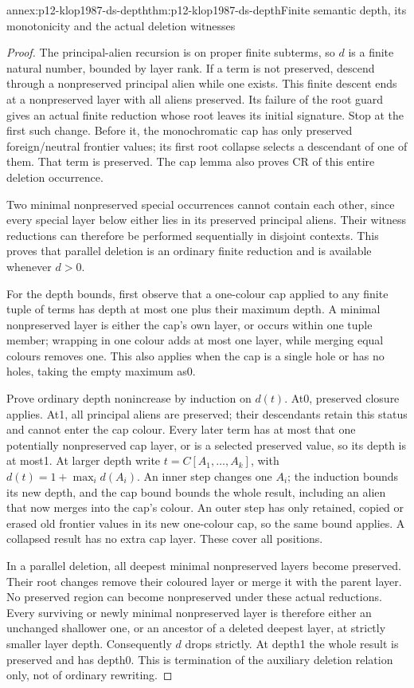 \begin{annexitem}{annex:p12-klop1987-ds-depth}{thm:p12-klop1987-ds-depth}{Finite semantic depth, its monotonicity and the actual deletion witnesses}
\begin{proof}
The principal-alien recursion is on proper finite subterms, so
\(d\) is a finite natural number, bounded by layer rank.
If a term is not preserved, descend through a nonpreserved principal
alien while one exists. This finite descent ends at a nonpreserved
layer with all aliens preserved. Its failure of the root guard gives
an actual finite reduction whose root leaves its initial signature.
Stop at the first such change. Before it, the monochromatic cap
has only preserved foreign/neutral frontier values; its first root
collapse selects a descendant of one of them. That term is preserved.
The cap lemma also proves CR of this entire deletion occurrence.

Two minimal nonpreserved special occurrences cannot contain each
other, since every special layer below either lies in its preserved
principal aliens. Their witness reductions can therefore be performed
sequentially in disjoint contexts. This proves that parallel deletion
is an ordinary finite reduction and is available whenever \(d>0\).

For the depth bounds, first observe that a one-colour cap applied
to any finite tuple of terms has depth at most one plus their
maximum depth. A minimal nonpreserved layer is either the cap's
own layer, or occurs within one tuple member; wrapping in one
colour adds at most one layer, while merging equal colours removes
one. This also applies when the cap is a single hole or has no
holes, taking the empty maximum as0.

Prove ordinary depth nonincrease by induction on \(d(t)\).
At0, preserved closure applies. At1, all principal aliens are
preserved; their descendants retain this status and cannot enter
the cap colour. Every later term has at most that one potentially
nonpreserved cap layer, or is a selected preserved value, so its
depth is at most1. At larger depth write
\(t=C[A_1,\ldots,A_k]\), with
\(d(t)=1+\max_i d(A_i)\). An inner step changes one \(A_i\);
the induction bounds its new depth, and the cap bound bounds the
whole result, including an alien that now merges into the cap's
colour. An outer step has only retained, copied or erased old
frontier values in its new one-colour cap, so the same bound applies.
A collapsed result has no extra cap layer. These cover all positions.

In a parallel deletion, all deepest minimal nonpreserved layers
become preserved. Their root changes remove their coloured layer
or merge it with the parent layer. No preserved region can become
nonpreserved under these actual reductions. Every surviving or
newly minimal nonpreserved layer is therefore either an unchanged
shallower one, or an ancestor of a deleted deepest layer, at strictly
smaller layer depth. Consequently \(d\) drops strictly. At depth1
the whole result is preserved and has depth0. This is termination
of the auxiliary deletion relation only, not of ordinary rewriting.
\end{proof}
\end{annexitem}

